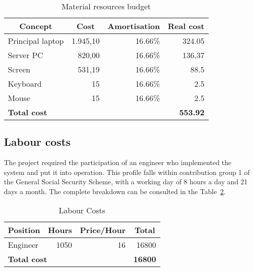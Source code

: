 \begin{table}[]
\centering
\begin{tabular}{|lrr|r|}
\hline
\multicolumn{1}{|c|}{\textbf{Concept}} & \multicolumn{1}{c|}{\textbf{Cost}} & \multicolumn{1}{c|}{\textbf{Amortisation}} & \multicolumn{1}{c|}{\textbf{Real cost}} \\ \hline
\multicolumn{1}{|l|}{Principal laptop} & \multicolumn{1}{r|}{1.945,10}      & 16.66\%                                    & 324.05                                  \\ \hline
\multicolumn{1}{|l|}{Server PC}        & \multicolumn{1}{r|}{820,00}        & 16.66\%                                    & 136,37                                  \\ \hline
\multicolumn{1}{|l|}{Screen}           & \multicolumn{1}{r|}{531,19}        & 16.66\%                                    & 88.5                                    \\ \hline
\multicolumn{1}{|l|}{Keyboard}         & \multicolumn{1}{r|}{15}            & 16.66\%                                    & 2.5                                     \\ \hline
\multicolumn{1}{|l|}{Mouse}            & \multicolumn{1}{r|}{15}            & 16.66\%                                    & 2.5                                     \\ \hline\hline
\multicolumn{3}{|l|}{\textbf{Total cost}}                                                                                         & \textbf{553.92}                         \\ \hline
\end{tabular}
\caption{Material resources budget}
\label{tab:hardware}
\end{table}

\subsection*{Labour costs}
The project required the participation of an engineer who implemented the system and put it into operation. This profile falls within contribution group 1 of the General Social Security Scheme, with a working day of 8 hours a day and 21 days a month. The complete breakdown can be consulted in the Table~\ref{tab:labour}.

\begin{table}[h]
\centering
\begin{tabular}{|lcc|r|}
\hline
\multicolumn{1}{|c|}{\textbf{Position}} & \multicolumn{1}{c|}{\textbf{Hours}} & \textbf{Price/Hour}     & \multicolumn{1}{c|}{\textbf{Total}} \\ \hline
\multicolumn{1}{|l|}{Engineer}          & \multicolumn{1}{r|}{1050}           & \multicolumn{1}{r|}{16} & 16800                               \\ \hline\hline
\multicolumn{3}{|l|}{\textbf{Total cost}}                                                                        & \textbf{16800}                      \\ \hline
\end{tabular}
\caption{Labour Costs}
\label{tab:labour}
\end{table}


